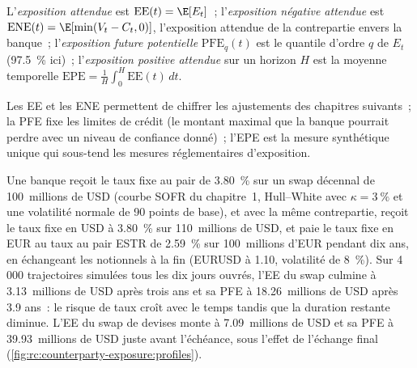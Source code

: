 \begin{definition}\label{def:rc:counterparty-exposure:profiles}
L'\emph{exposition attendue} est $\mathrm{EE}(t) = \E[E_t]$~;
l'\emph{exposition négative attendue} est
$\mathrm{ENE}(t) = \E[\min(V_t-C_t,0)]$, l'exposition attendue de la contrepartie envers la banque~;
l'\emph{exposition future potentielle} $\mathrm{PFE}_q(t)$ est le
quantile d'ordre $q$ de $E_t$ (97.5~\% ici)~; l'\emph{exposition positive
attendue} sur un horizon $H$ est la moyenne temporelle
$\mathrm{EPE} = \frac1H\int_0^H\mathrm{EE}(t)\,dt$.
\end{definition}

Les EE et les ENE permettent de chiffrer les ajustements des chapitres suivants~; la PFE fixe les limites de crédit (le
montant maximal que la banque pourrait perdre avec un niveau de confiance donné)~; l'EPE est la mesure
synthétique unique qui sous-tend les mesures réglementaires d'exposition.

\begin{example}\label{ex:rc:counterparty-exposure:profiles}
Une banque reçoit le taux fixe au pair de 3.80~\% sur un swap décennal de 100~millions de USD
(courbe SOFR du chapitre~1, Hull--White avec $\kappa = 3~\%$ et une volatilité normale de 90 points de
base), et avec la même contrepartie, reçoit le taux fixe en USD à 3.80~\% sur 110~millions de USD, et
paie le taux fixe en EUR au taux au pair ESTR de 2.59~\% sur 100~millions d'EUR pendant dix ans, en
échangeant les notionnels à la fin (EURUSD à 1.10, volatilité de 8~\%). Sur 4\,000 trajectoires simulées
tous les dix jours ouvrés, l'EE du swap culmine à 3.13~millions de USD après trois ans et sa PFE
à 18.26~millions de USD après 3.9 ans~: le risque de taux croît avec le temps tandis que la duration
restante diminue. L'EE du swap de devises monte à 7.09~millions de USD et sa PFE à
39.93~millions de USD juste avant l'échéance, sous l'effet de l'échange final
(\cref{fig:rc:counterparty-exposure:profiles}).
\end{example}


